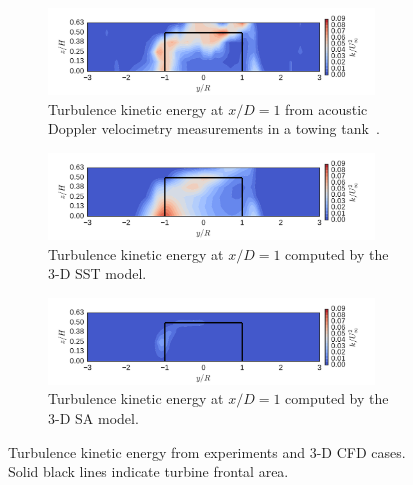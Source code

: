 \documentclass[aip,graphicx]{revtex4-1}
\begin{document}
\begin{figure}
    \centering
    \begin{subfigure}[b]{\textwidth}
        \centering

        \includegraphics[width=0.95\textwidth]{kcont_exp}

        \caption{Turbulence kinetic energy at $x/D=1$ from acoustic Doppler
        velocimetry measurements in a towing
        tank~\cite{Bachant2016-RVAT-Re-dep}.}

        \label{fig:kcont-exp}
    \end{subfigure}

    \begin{subfigure}[b]{\textwidth}
        \centering

        \includegraphics[width=0.95\textwidth]{kcont_kOmegaSST}

        \caption{Turbulence kinetic energy at $x/D=1$ computed by the 3-D SST
            model.}

        \label{fig:kcont-SST}
    \end{subfigure}

    \begin{subfigure}[b]{\textwidth}
        \centering

        \includegraphics[width=0.95\textwidth]{kcont_SpalartAllmaras}

        \caption{Turbulence kinetic energy at $x/D=1$ computed by the 3-D SA
            model.}

        \label{fig:kcont-SA}
    \end{subfigure}

    \caption{Turbulence kinetic energy from experiments and 3-D CFD cases. Solid
        black lines indicate turbine frontal area.}

    \label{fig:br-cfd-kcont}
\end{figure}
\end{document}
